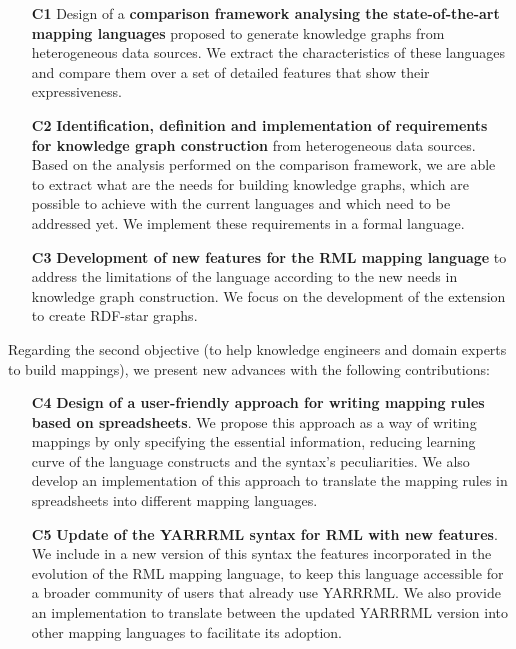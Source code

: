 \begin{enumerate}
    \item[\textbf{C1}] Design of a \textbf{comparison framework analysing the state-of-the-art mapping languages} proposed to generate knowledge graphs from heterogeneous data sources. We extract the characteristics of these languages and compare them over a set of detailed features that show their expressiveness. 
    
    \item[\textbf{C2}] \textbf{Identification, definition and implementation of requirements for knowledge graph construction} from heterogeneous data sources. Based on the analysis performed on the comparison framework, we are able to extract what are the needs for building knowledge graphs, which are possible to achieve with the current languages and which need to be addressed yet. We implement these requirements in a formal language. 
    
    \item[\textbf{C3}] \textbf{Development of new features for the RML mapping language} to address the limitations of the language according to the new needs in knowledge graph construction. We focus on the development of the extension to create RDF-star graphs. 
\end{enumerate}

Regarding the second objective (to help knowledge engineers and domain experts to build mappings), we present new advances with the following contributions:

\begin{enumerate}
    \item[\textbf{C4}] \textbf{Design of a user-friendly approach for writing mapping rules based on spreadsheets}. We propose this approach as a way of writing mappings by only specifying the essential information, reducing learning curve of the language constructs and the syntax's peculiarities. We also develop an implementation of this approach to translate the mapping rules in spreadsheets into different mapping languages. 
    \item[\textbf{C5}] \textbf{Update of the YARRRML syntax for RML with new features}. We include in a new version of this syntax the features incorporated in the evolution of the RML mapping language, to keep this language accessible for a broader community of users that already use YARRRML. We also provide an implementation to translate between the updated YARRRML version into other mapping languages to facilitate its adoption.
\end{enumerate}

